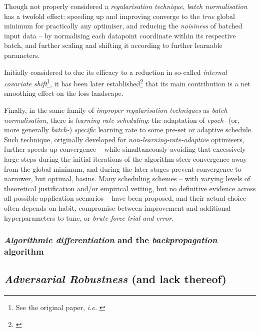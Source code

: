 Though not properly considered a \textit{regularisation technique}, \textit{batch normalisation} has a twofold effect: speeding up and improving converge to the \textit{true} global minimum for practically any optimiser, and reducing the \textit{noisiness} of batched input data -- by normalising each datapoint coordinate within its respective batch, and further scaling and shifting it according to further learnable parameters.

Initially considered to due its efficacy to a reduction in so-called \textit{internal covariate shift}\footnote{See the original paper, \textit{i.e.} \cite{IoffeSzegedy2015BatchNorm}}, it has been later established\footnote{\cite{SanturkarEtAl2018BatchNorm}} that its main contribution is a net smoothing effect on the loss landscape.

Finally, in the same family of \textit{improper regularisation techniques} as \textit{batch normalisation}, there is \textit{learning rate scheduling}: the adaptation of \textit{epoch-} (or, more generally \textit{batch-}) \textit{specific} learning rate to some pre-set or adaptive schedule. Such technique, originally developed for \textit{non-learning-rate-adaptive} optimisers, further speeds up convergence -- while simultaneously avoiding that excessively large steps during the initial iterations of the algorithm steer convergence away from the global minimum, and during the later stages prevent convergence to narrower, but optimal, basins. Many scheduling schemes -- with varying levels of theoretical justification and/or empirical vetting, but no definitive evidence across all possible application scenarios -- have been proposed, and their actual choice often depends on habit, compromise between improvement and additional hyperparameters to tune, or \textit{brute force} \textit{trial and error}.

\subsubsection{\textit{Algorithmic differentiation} and the \textit{backpropagation} algorithm}


\subsection{\textit{Adversarial Robustness} (and lack thereof)}
